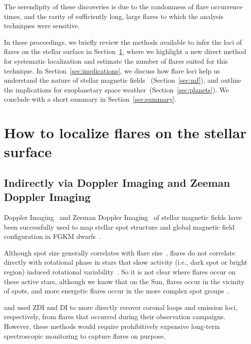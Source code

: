\documentclass[proof]{WileyASNA-v1}
\begin{document}
The serendipity of these discoveries is due to the randomness of flare occurrence times, and the rarity of sufficiently long, large flares to which the analysis techniques were sensitive. 

In these proceedings, we briefly review the methods available to infer the loci of flares on the stellar surface in Section~\ref{sec:howto}, where we highlight a new direct method for systematic localization and estimate the number of flares suited for this technique. In Section~\ref{sec:implications}, we discuss how flare loci help us understand the nature of stellar magnetic fields ~(Section~\ref{sec:mf}), and outline the implications for exoplanetary space weather~(Section~\ref{sec:planets}). We conclude with a short summary in Section~\ref{sec:summary}.

\section{How to localize flares on the stellar surface}
\label{sec:howto}

\subsection{Indirectly via Doppler Imaging and Zeeman Doppler Imaging }
Doppler Imaging~\citep{deutsch1958, goncharskii1977} and Zeeman Doppler Imaging~\citep{semel1989, donati1989} of stellar magnetic fields have been successfully used to map stellar spot structure and global magnetic field configuration in FGKM dwarfs~\citep{strassmeier2002,morin2008,morin2010,see2019}.

Although spot size generally correlates with flare size~\citep{maehara2017}, flares do not correlate directly with rotational phase in stars that show activity (i.e., dark spot or bright region) induced rotational variability~\citep{doyle2019}. So it is not clear where flares occur on these active stars, although we know that on the Sun, flares occur in the vicinity of spots, and more energetic flares occur in the more complex spot groups~\citep{sammis2000}. 

\citet{berdyugina2017} and \citet{wolter2008} used ZDI and DI to more directly recover coronal loops and emission loci, respectively, from flares that occurred during their observation campaigns. However, these methods would require prohibitively expensive long-term spectroscopic monitoring to capture flares on purpose.
\end{document}
